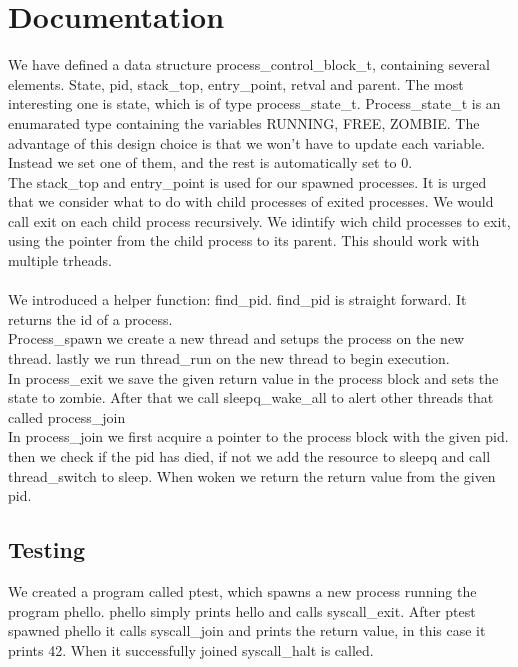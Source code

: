 \documentclass[12pt]{article}
\begin{document}
\section*{Documentation}

We have defined a data structure process\_control\_block\_t, containing several elements. State, pid, stack\_top, entry\_point, retval and parent. The most interesting one is state, which is of type process\_state\_t. Process\_state\_t is an enumarated type containing the variables RUNNING, FREE, ZOMBIE. The advantage of this design choice is that we won't have to update each variable. Instead we set one of them, and the rest is automatically set to 0.\\ 
The stack\_top and entry\_point is used for our spawned processes. It is urged that we consider what to do with child processes of exited processes. We would call exit on each child process recursively. We idintify wich child processes to exit, using the pointer from the child process to its parent. This should work with multiple trheads.\\\\
We introduced a helper function: find\_pid. find\_pid is straight forward. It returns the id of a process.
\\
Process\_spawn we create a new thread and setups the process on the new thread. lastly we run thread\_run on the new thread to begin execution.\\
In process\_exit we save the given return value in the process block and sets the state to zombie. 
After that we call sleepq\_wake\_all to alert other threads that called process\_join
\\
In process\_join we first acquire a pointer to the process block with the given pid. then we check if the pid has died, if not we add the resource to sleepq and call thread\_switch to sleep. When woken we return the return value from the given pid.
\subsection*{Testing}
We created a program called ptest, which spawns a new process running the program phello. phello simply prints hello and calls syscall\_exit. After ptest spawned phello it calls syscall\_join and prints the return value, in this case it prints 42. When it successfully joined syscall\_halt is called.
\end{document}
